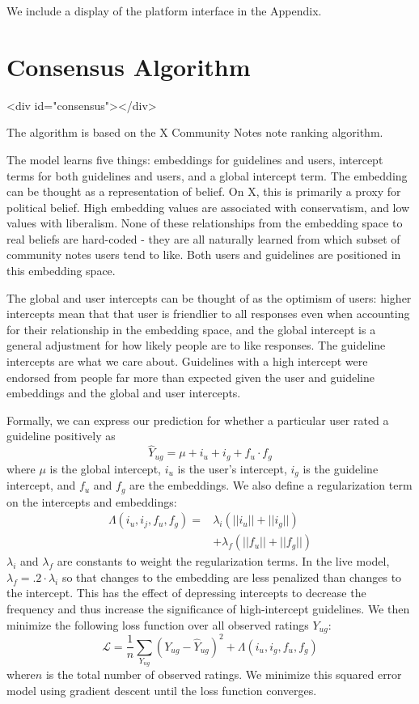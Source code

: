 \documentclass{article}
\begin{document}
\begin{multicols}{2}
We include a display of the platform interface in the Appendix.

\section{Consensus Algorithm} <div id="consensus"></div>

The algorithm is based on the X Community Notes note ranking algorithm. \cite{birdwatch2022, NoteRankingAlgorithm}

The model learns five things: embeddings for guidelines and users, intercept terms for both guidelines and users, and a global intercept term. The embedding can be thought as a representation of belief. On X, this is primarily a proxy for political belief. High embedding values are associated with conservatism, and low values with liberalism. None of these relationships from the embedding space to real beliefs are hard-coded - they are all naturally learned from which subset of community notes users tend to like. Both users and guidelines are positioned in this embedding space.

The global and user intercepts can be thought of as the optimism of users: higher intercepts mean that that user is friendlier to all responses even when accounting for their relationship in the embedding space, and the global intercept is a general adjustment for how likely people are to like responses.
The guideline intercepts are what we care about. Guidelines with a high intercept were endorsed from people far more than expected given the user and guideline embeddings and the global and user intercepts.

Formally, we can express our prediction for whether a particular user rated a guideline positively as
 $$ \hat Y_{ug} = \mu + i_u + i_g +f_u \cdot f_g$$
 where $\mu$ is the global intercept, $i_u$ is the user's intercept, $i_g$ is the guideline intercept, and $f_u$ and $f_g$ are the embeddings. We also define a regularization term on the intercepts and embeddings:
 \begin{align*}
 \Lambda( i_u, i_j, f_u, f_g) = & \lambda_i \left(||i_u|| + ||i_g||\right)\\
& + \lambda_f \left(||f_u|| + ||f_g||\right)
 \end{align*}
 $\lambda_i$ and $\lambda_f$ are constants to weight the regularization terms. In the live model, $\lambda_f = .2 \cdot \lambda_i$ so that changes to the embedding are less penalized than changes to the intercept. This has the effect of depressing intercepts to decrease the frequency and thus increase the significance of high-intercept guidelines. 
 We then minimize the following loss function over all observed ratings $Y_{ug}$:
$$
\mathscr{L} = \frac{1}{n}\sum_{Y_{ug}} \left(Y_{ug} - \hat Y_{ug}\right)^2 + \Lambda( i_u, i_g, f_u, f_g)
$$
where$n$ is the total number of observed ratings. We minimize this squared error model using gradient descent until the loss function converges.


\end{multicols}
\end{document}
